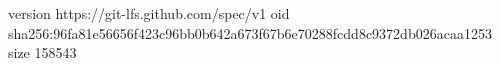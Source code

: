 version https://git-lfs.github.com/spec/v1
oid sha256:96fa81e56656f423c96bb0b642a673f67b6e70288fcdd8c9372db026acaa1253
size 158543
